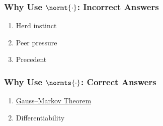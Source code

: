 \begin{frame}
\frametitle{Why Use $\normt{\cdot}$: Incorrect Answers}
\begin{enumerate}
	\item Herd instinct
	\item Peer pressure
	\item Precedent
\end{enumerate}
\end{frame}
%
\begin{frame}
\frametitle{Why Use $\normts{\cdot}$: Correct Answers}
\begin{enumerate}
	\item \href{https://en.wikipedia.org/wiki/Gauss\%E2\%80\%93Markov_theorem}{Gauss--Markov Theorem}
	\item Differentiability
\end{enumerate}
\end{frame}
%
